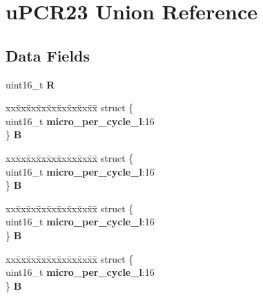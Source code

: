 \hypertarget{unionuPCR23}{}\section{u\+P\+C\+R23 Union Reference}
\label{unionuPCR23}
\subsection*{Data Fields}
\begin{DoxyCompactItemize}
\item 
\mbox{\label{unionuPCR23_a1e59ee1cc4daf4c9b297f483b02ca594}} 
uint16\+\_\+t {\bfseries R}
\item 
\mbox{\label{unionuPCR23_a944dbb5bd03dab1412c868cac77a3932}} 
\begin{tabbing}
xx\=xx\=xx\=xx\=xx\=xx\=xx\=xx\=xx\=\kill
struct \{\\
\>uint16\_t {\bfseries micro\_per\_cycle\_l}:16\\
\} {\bfseries B}\\

\end{tabbing}\item 
\mbox{\label{unionuPCR23_aa9c821dc82ea7aac1999ae401acd9746}} 
\begin{tabbing}
xx\=xx\=xx\=xx\=xx\=xx\=xx\=xx\=xx\=\kill
struct \{\\
\>uint16\_t {\bfseries micro\_per\_cycle\_l}:16\\
\} {\bfseries B}\\

\end{tabbing}\item 
\mbox{\label{unionuPCR23_a05727c509cf118ce732dd1bbfa392c1d}} 
\begin{tabbing}
xx\=xx\=xx\=xx\=xx\=xx\=xx\=xx\=xx\=\kill
struct \{\\
\>uint16\_t {\bfseries micro\_per\_cycle\_l}:16\\
\} {\bfseries B}\\

\end{tabbing}\item 
\mbox{\label{unionuPCR23_a0e71ca0030bbf53035a44cfcb8bdd85e}} 
\begin{tabbing}
xx\=xx\=xx\=xx\=xx\=xx\=xx\=xx\=xx\=\kill
struct \{\\
\>uint16\_t {\bfseries micro\_per\_cycle\_l}:16\\
\} {\bfseries B}\\

\end{tabbing}\end{DoxyCompactItemize}


